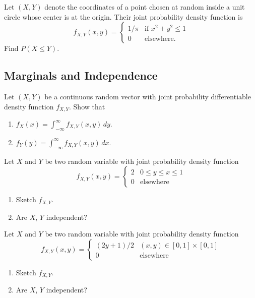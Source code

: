 \begin{problem}
Let $(X, Y)$ denote the coordinates of a point chosen at random inside a unit circle whose center is at the origin. Their joint probability density function is
    \[
        f_{X, Y} (x, y) = \left\lbrace \begin{matrix} 1/ \pi & \text{if } x^2 + y^2 \leq 1 \\
        0 & \text{elsewhere.} \end{matrix} \right.
    \]
Find $P (X \leq Y)$. 
\end{problem}

\subsection{Marginals and Independence}

\begin{problem}
Let $(X, Y)$ be a continuous random vector with joint probability differentiable density function $f_{X, Y}$. Show that
    \begin{enumerate}[label=\alph*)]
        \item $f_X (x) = \displaystyle\int_{-\infty}^\infty f_{X, Y} (x, y) \, dy$.
        \item $f_Y (y) = \displaystyle\int_{-\infty}^\infty f_{X, Y} (x, y) \, dx$.
    \end{enumerate}
\end{problem}

\begin{problem}
Let $X$ and $Y$ be two random variable with joint probability density function
    \[
        f_{X, Y} (x, y) = \left\lbrace \begin{matrix} 2 & 0 \leq y \leq x \leq 1 \\
                            0 & \text{elsewhere} \end{matrix} \right. 
    \]  
    \begin{enumerate}[label=\alph*)]
        \item Sketch $f_{X, Y}$.
        \item Are $X$, $Y$ independent?
    \end{enumerate}
\end{problem}

\begin{problem}
Let $X$ and $Y$ be two random variable with joint probability density function
    \[
        f_{X, Y} (x, y) = \left\lbrace \begin{matrix} (2y+ 1)/2 & (x, y) \in [0, 1] \times [0, 1] \\
                            0 & \text{elsewhere} \end{matrix} \right. 
    \]  
    \begin{enumerate}[label=\alph*)]
        \item Sketch $f_{X, Y}$.
        \item Are $X$, $Y$ independent?
    \end{enumerate}
\end{problem}

